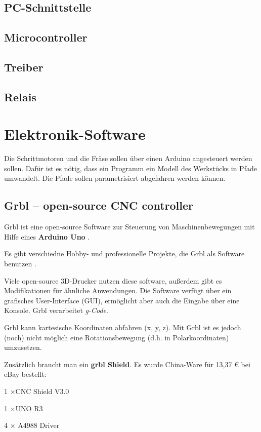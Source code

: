 \documentclass[
	a4paper,
	smallheadings,
	german,
	]
	{scrreprt}
\begin{document}
	\subsection{PC-Schnittstelle}
	\subsection{Microcontroller}
	\subsection{Treiber}
	\subsection{Relais}
\section{Elektronik-Software}
Die Schrittmotoren und die Fräse sollen über einen Arduino angesteuert werden sollen.
Dafür ist es nötig, dass ein Programm ein Modell des Werkstücks in Pfade umwandelt.
Die Pfade sollen parametrisiert abgefahren werden können.

\subsection{Grbl -- open-source CNC controller}
Grbl ist eine open-source Software zur Steuerung von Maschinenbewegungen mit Hilfe eines \textbf{Arduino Uno} \autocite{:Sonny2017}.

Es gibt verschiedne Hobby- und professionelle Projekte, die Grbl als Software benutzen \autocite{:Herbert,:kickstarter,:Meissner,:NYC_CNC_01}.

Viele open-source 3D-Drucker nutzen diese software, außerdem gibt es Modifikationen für ähnliche Anwendungen.
Die Software verfügt über ein grafisches User-Interface (GUI), ermöglicht aber auch die Eingabe über eine Konsole.
Grbl verarbeitet \textit{g-Code}.

Grbl kann kartesische Koordinaten abfahren (x, y, z). 
Mit Grbl ist es jedoch (noch) nicht möglich eine Rotationsbewegung (d.h. in Polarkoordinaten) umzusetzen.

Zusätzlich braucht man ein \textbf{grbl Shield}.
Es wurde China-Ware für 13,37 € bei eBay bestellt:
\begin{itemize*}
	\item 1 $\times$CNC Shield V3.0
	\item 1 $\times$UNO R3
	\item 4 $\times$ A4988 Driver
\end{itemize*}
\end{document}
